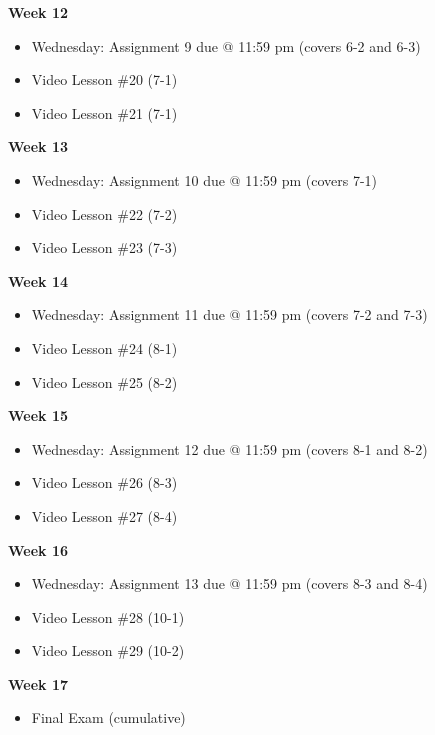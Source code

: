 \documentclass[12pt]{letter}
\newcommand{\?}{\stackrel{?}{=}}
\begin{document}
	\textbf{Week 12} \begin{itemize} \vspace{-12pt}
		\item Wednesday: Assignment 9 due @ 11:59 pm (covers 6-2 and 6-3)
		\item Video Lesson \#20 (7-1)
		\item Video Lesson \#21 (7-1)
	\end{itemize}

	\textbf{Week 13} \begin{itemize} \vspace{-12pt}
		\item Wednesday: Assignment 10 due @ 11:59 pm (covers 7-1)
		\item Video Lesson \#22 (7-2)
		\item Video Lesson \#23 (7-3)
	\end{itemize}

	\textbf{Week 14} \begin{itemize} \vspace{-12pt}
		\item Wednesday: Assignment 11 due @ 11:59 pm (covers 7-2 and 7-3)
		\item Video Lesson \#24 (8-1)
		\item Video Lesson \#25 (8-2)
	\end{itemize}
	
	\textbf{Week 15} \begin{itemize} \vspace{-12pt}
		\item Wednesday: Assignment 12 due @ 11:59 pm (covers 8-1 and 8-2)
		\item Video Lesson \#26 (8-3)
		\item Video Lesson \#27 (8-4)
	\end{itemize}

	\textbf{Week 16} \begin{itemize} \vspace{-12pt}
		\item Wednesday: Assignment 13 due @ 11:59 pm (covers 8-3 and 8-4)
		\item Video Lesson \#28 (10-1)
		\item Video Lesson \#29 (10-2)
	\end{itemize}

	\textbf{Week 17} \begin{itemize} \vspace{-12pt}
		\item Final Exam (cumulative)
	\end{itemize}
	
\end{document}
